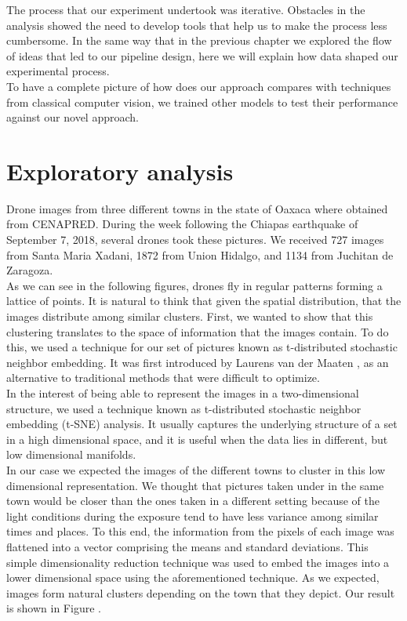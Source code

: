 The process that our experiment undertook was iterative. Obstacles in the analysis showed the need to develop tools that help us to make the process less cumbersome. In the same way that in the previous chapter we explored the flow of ideas that led to our pipeline design, here we will explain how data shaped our experimental process.\\

To have a complete picture of how does our approach compares with techniques from classical computer vision, we trained other models to test their performance against our novel approach.\\

\section{Exploratory analysis}

Drone images from three different towns in the state of Oaxaca where obtained from CENAPRED. During the week following the Chiapas earthquake of September 7, 2018, several drones took these pictures. We received 727 images from Santa Maria Xadani, 1872 from Union Hidalgo, and 1134 from Juchitan de Zaragoza.\\

As we can see in the following figures, drones fly in regular patterns forming a lattice of points. It is natural to think that given the spatial distribution, that the images distribute among similar clusters. First, we wanted to show that this clustering translates to the space of information that the images contain. To do this, we used a technique for our set of pictures known as t-distributed stochastic neighbor embedding. It was first introduced by Laurens van der Maaten \cite{t-sne}, as an alternative to traditional methods that were difficult to optimize.\\

In the interest of being able to represent the images in a two-dimensional structure, we used a technique known as t-distributed stochastic neighbor embedding (t-SNE) analysis. It usually captures the underlying structure of a set in a high dimensional space, and it is useful when the data lies in different, but low dimensional manifolds.\\

In our case we expected the images of the different towns to cluster in this low dimensional representation. We thought that pictures taken under in the same town would be closer than the ones taken in a different setting because of the light conditions during the exposure tend to have less variance among similar times and places. To this end, the information from the pixels of each image was flattened into a vector comprising the means and standard deviations. This simple dimensionality reduction technique was used to embed the images into a lower dimensional space using the aforementioned technique. As we expected, images form natural clusters depending on the town that they depict. Our result is shown in Figure \cite{fig:tsne}.\\

